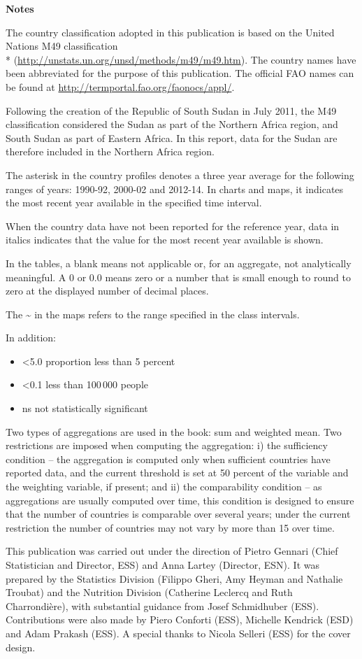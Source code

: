 \onecolumn
\LARGE
\textbf{Notes}

\footnotesize
The country classification adopted in this publication is based on the United Nations M49 classification \\* (\url{http://unstats.un.org/unsd/methods/m49/m49.htm}). The country names have been abbreviated for the purpose of this publication. The official FAO names can be found at \url{http://termportal.fao.org/faonocs/appl/}.

Following the creation of the Republic of South Sudan in July 2011, the M49 classification considered the Sudan as part of the Northern Africa region, and South Sudan as part of Eastern Africa. In this report, data for the Sudan are therefore included in the Northern Africa region.

The asterisk in the country profiles denotes a three year average for the following ranges of years: 1990-92, 2000-02 and 2012-14. In charts and maps, it indicates the most recent year available in the specified time interval.

When the country data have not been reported for the reference year, data in italics indicates that the value for the most recent year available is shown.

In the tables, a blank means not applicable or, for an aggregate, not analytically meaningful. A 0 or 0.0 means zero or a number that is small enough to round to zero at the displayed number of decimal places.

The \textasciitilde{} in the maps refers to the range specified in the class intervals.

In addition:
\begin{itemize}
\item <5.0 proportion less than 5 percent
\item <0.1 less than 100\,000 people
\item ns not statistically significant 
\end{itemize}

Two types of aggregations are used in the book: sum and weighted mean. Two restrictions are imposed when computing the aggregation: i) the sufficiency condition – the aggregation is computed only when sufficient countries have reported data, and the current threshold is set at 50 percent of the variable and the weighting variable, if present; and ii) the comparability condition – as aggregations are usually computed over time, this condition is designed to ensure that the number of countries is comparable over several years; under the current restriction the number of countries may not vary by more than 15 over time.

This publication was carried out under the direction of Pietro Gennari (Chief Statistician and Director, ESS) and Anna Lartey (Director, ESN). It was prepared by the Statistics Division (Filippo Gheri, Amy Heyman and Nathalie Troubat) and the Nutrition Division (Catherine Leclercq and Ruth Charrondière), with substantial guidance from Josef Schmidhuber (ESS). Contributions were also made by Piero Conforti (ESS), Michelle Kendrick (ESD) and Adam Prakash (ESS). A special thanks to Nicola Selleri (ESS) for the cover design.